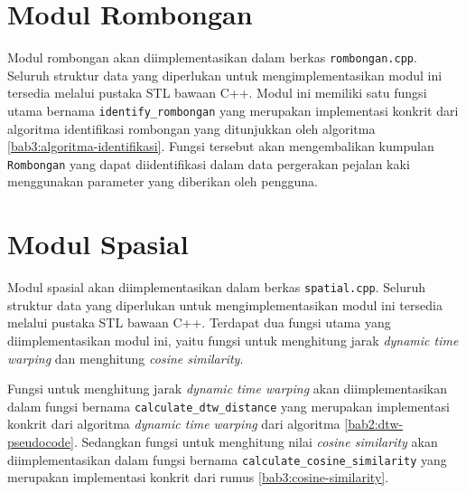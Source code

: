 \iffalse

\cristopher{ga penting?}

Untuk memenuhi kebutuhan tersebut, digunakan struktur data bernama \texttt{Map}. \texttt{Map} dipilih karena struktur data tersebut memiliki kemampuan untuk menyimpan dan mengembalikan pemetaan dengan kompleksitas waktu yang cenderung kecil. Pada implementasi dari modul ini, digunakan 2 buah \texttt{Map} di mana \texttt{Map} pertama digunakan untuk memetakan \textit{frame} pada entitas-entitas yang tercatat pada data pergerakan dan \texttt{Map} kedua digunakan untuk membalik pemetaan dari \texttt{Map} pertama menjadi pemetaan entitas pada \textit{frame} sehingga mempermudah proses pembuatan struktur data komposit yang akan dikembalikan.

\fi

\section{Modul Rombongan}
\label{sec:impl-rombongan}

Modul rombongan akan diimplementasikan dalam berkas \texttt{rombongan.cpp}. Seluruh struktur data yang diperlukan untuk mengimplementasikan modul ini tersedia melalui pustaka STL bawaan C++. Modul ini memiliki satu fungsi utama bernama \texttt{identify\_rombongan} yang merupakan implementasi konkrit dari algoritma identifikasi rombongan yang ditunjukkan oleh algoritma \ref{bab3:algoritma-identifikasi}. Fungsi tersebut akan mengembalikan kumpulan \texttt{Rombongan} yang dapat diidentifikasi dalam data pergerakan pejalan kaki menggunakan parameter yang diberikan oleh pengguna.

\section{Modul Spasial}

Modul spasial akan diimplementasikan dalam berkas \texttt{spatial.cpp}. Seluruh struktur data yang diperlukan untuk mengimplementasikan modul ini tersedia melalui pustaka STL bawaan C++. Terdapat dua fungsi utama yang diimplementasikan modul ini, yaitu fungsi untuk menghitung jarak \textit{dynamic time warping} dan menghitung \textit{cosine similarity}.

Fungsi untuk menghitung jarak \textit{dynamic time warping} akan diimplementasikan dalam fungsi bernama \texttt{calculate\_dtw\_distance} yang merupakan implementasi konkrit dari algoritma \textit{dynamic time warping} dari algoritma \ref{bab2:dtw-pseudocode}. Sedangkan fungsi untuk menghitung nilai \textit{cosine similarity} akan diimplementasikan dalam fungsi bernama \texttt{calculate\_cosine\_similarity} yang merupakan implementasi konkrit dari rumus \ref{bab3:cosine-similarity}.

